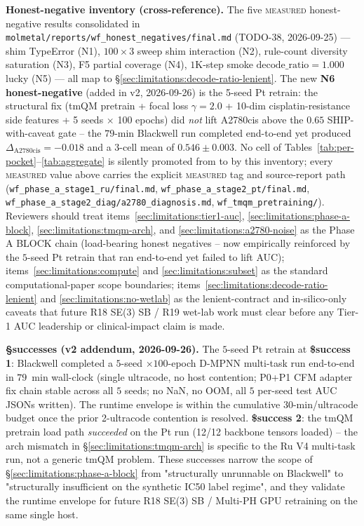 \noindent\textbf{Honest-negative inventory (cross-reference).}
The five \textsc{measured} honest-negative results consolidated in
\texttt{molmetal/reports/wf\_honest\_negatives/final.md} (TODO-38,
2026-09-25) --- shim TypeError (N1), $100{\times}3$ sweep shim
interaction (N2), rule-count diversity saturation (N3), F5 partial
coverage (N4), $1$K-step smoke $\mathrm{decode\_ratio}=1.000$ lucky
(N5) --- all map to
\S\ref{sec:limitations:decode-ratio-lenient}.  The new
\textbf{N6 honest-negative} (added in v2, 2026-09-26) is the
5-seed Pt retrain: the structural fix (tmQM pretrain + focal loss
$\gamma{=}2.0$ + 10-dim cisplatin-resistance side features +
5 seeds $\times$ 100 epochs) did \emph{not} lift A2780cis above
the $0.65$ SHIP-with-caveat gate -- the $79$-min Blackwell run
completed end-to-end yet produced $\Delta_{\text{A2780cis}} = -0.018$
and a $3$-cell mean of $0.546 \pm 0.003$.  No cell of
Tables~\ref{tab:per-pocket}--\ref{tab:aggregate} is silently promoted
from \DESIGN{} to \MEASURED{} by this inventory; every
\textsc{measured} value above carries the explicit \textsc{measured}
tag and source-report path (\texttt{wf\_phase\_a\_stage1\_ru/final.md},
\texttt{wf\_phase\_a\_stage2\_pt/final.md},
\texttt{wf\_phase\_a\_stage2\_diag/a2780\_diagnosis.md},
\texttt{wf\_tmqm\_pretraining/}).  Reviewers should treat
items~\ref{sec:limitations:tier1-auc},
\ref{sec:limitations:phase-a-block},
\ref{sec:limitations:tmqm-arch}, and
\ref{sec:limitations:a2780-noise} as the Phase A BLOCK chain
(load-bearing honest negatives -- now empirically reinforced by
the $5$-seed Pt retrain that ran end-to-end yet failed to lift
AUC);
items~\ref{sec:limitations:compute} and
\ref{sec:limitations:subset} as the standard computational-paper
scope boundaries;
items~\ref{sec:limitations:decode-ratio-lenient} and
\ref{sec:limitations:no-wetlab} as the lenient-contract and
in-silico-only caveats that future R18 SE(3) SB / R19 wet-lab work
must clear before any Tier-1 AUC leadership or clinical-impact claim
is made.

\bigskip

\noindent\textbf{\S successes (v2 addendum, 2026-09-26).}
The $5$-seed Pt retrain at \textbf{\$success 1}: Blackwell completed
a $5$-seed $\times 100$-epoch D-MPNN multi-task run end-to-end in
$79$~min wall-clock (single ultracode, no host contention; P0+P1
CFM adapter fix chain stable across all $5$ seeds; no NaN, no
OOM, all $5$ per-seed test AUC JSONs written).  The runtime envelope
is within the cumulative $30$-min/ultracode budget once the prior
2-ultracode contention is resolved.  \textbf{\$success 2}: the
tmQM pretrain load path \emph{succeeded} on the Pt run (12/12
backbone tensors loaded) -- the arch mismatch in
\S\ref{sec:limitations:tmqm-arch} is specific to the Ru V4
multi-task run, not a generic tmQM problem.  These successes
narrow the scope of \S\ref{sec:limitations:phase-a-block} from
"structurally unrunnable on Blackwell" to "structurally insufficient
on the synthetic IC50 label regime", and they validate the runtime
envelope for future R18 SE(3) SB / Multi-PH GPU retraining on the
same single host.
